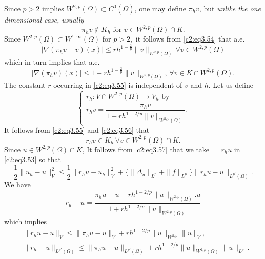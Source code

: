 Since $p >2$ implies $W^{2,p}(\Omega)\subset C^0 (\overline{\Omega})$,
one may define $\pi_h v$, but \textit{unlike the one dimensional case,
  usually} 
  $$
  \pi_h v \notin K_h \text{ for } v \in W^{2, p}(\Omega) \cap K . 
  $$
  Since $W^{2, p}(\Omega) \subset W^{1,\infty} (\Omega)$ for $p>2,$ it
  follows from \eqref{c2:eq3.54} that a.e.  
  $$
|\nabla (\pi_h v-v) (x) | \leq rh^{1-\frac{2}{p}} \parallel v\parallel_{W^{2,
    p}(\Omega)}\, \forall  v \in W^{2, p}(\Omega) 
  $$
  which in turn implies that a.e.
  \begin{equation}
|\nabla (\pi_h v) (x) | \leq 1 + rh^{1 - \frac{2}{p}}
\parallel v\parallel_{W^{2, p} (\Omega)},\, \forall  v \in K \cap W^{2,
p}(\Omega). 
\tag{3.55}\label{c2:eq3.55} 
  \end{equation}  
  The constant $r$ occurring in \eqref{c2:eq3.55} is independent of $v$
  and $h$. Let us define  
  \begin{equation}
\begin{cases}
r_h : V \cap W^{2, p}(\Omega) \to V_h \text{ by }\\
r_h v = \dfrac{\pi_h v}{1 + r h^{1 - 2/p} \parallel v\parallel_{W^{2, p} (\Omega)}} .
\end{cases}\tag{3.56}\label{c2:eq3.56}
 \end{equation}  
  It follows from \eqref{c2:eq3.55}  and \eqref{c2:eq3.56} that 
  \begin{equation}
r_h v \in K_h\, \forall  v \in W^{2, p}(\Omega) \cap
K. \tag{3.57}\label{c2:eq3.57} 
  \end{equation}  
  Since $u \in W^{2, p}(\Omega) \cap K$, It follows  from \eqref{c2:eq3.57}
  that we take $ = r_h u$ in \eqref{c2:eq3.53} so that  
  \begin{equation}
\frac{1}{2} \parallel u_h - u\parallel^2_V \leq \frac{1}{2} \parallel r_h u - u_h\parallel^2_V +
\{\parallel \Delta_u\parallel_{L^p} + \parallel f\parallel_{L^p} \}
\parallel r_hu-u\parallel_{L^{p'}(\Omega)}. \tag{3.58}\label{c2:eq3.58} 
\end{equation}\pageoriginale 
We have 
$$
r_u - u = \frac{\pi_h u-u - rh^{1-2/p} \parallel u\parallel_{W^{2, p}(\Omega)}.u}
{1+rh^{1-2/p}\parallel u\parallel_{W^{2, p}(\Omega)}} 
$$
which implies 
\begin{align*}
& \parallel r_h u-u\parallel_V \leq \parallel \pi_h u-u\parallel_V + rh^{1-2/p}\parallel u\parallel_{W^{2, p}}
  \parallel u\parallel_V, \tag{3.59}\label{c2:eq3.59}\\ 
& \parallel r_h - u\parallel_{L^{p'}(\Omega)}\leq \parallel \pi_h u-u\parallel_{L^{p'}(\Omega)} + r
  h^{1-2/p}\parallel u\parallel_{W^{2, p}(\Omega)}\parallel u\parallel_{L^{p'}} .\tag{3.60}\label{c2:eq3.60} 
\end{align*}

